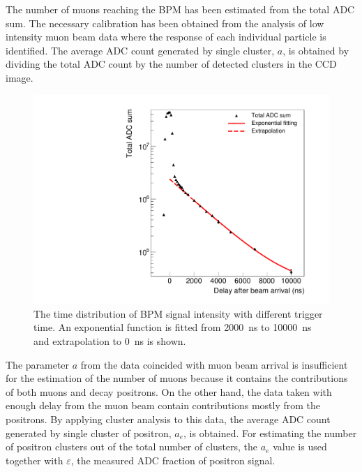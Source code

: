 \documentclass[preprint,3p,twocolumn]{elsarticle}
\begin{document}
The number of muons reaching the BPM has been estimated from the total ADC sum. The necessary calibration has been obtained from the analysis of low intensity muon beam data where the response of each individual particle is identified. The average ADC count generated by single cluster, $a$, is obtained by dividing the total ADC count by the number of detected clusters in the CCD image.
\begin{figure}[btp]
	\centering
	\includegraphics[width=\columnwidth]{figure/Decay_v3.pdf}
	\caption{The time distribution of BPM signal intensity with different trigger time. An exponential function is fitted from \SI{2000}{\ns} to \SI{10000}{\ns} and extrapolation to \SI{0}{\ns} is shown.}
	\label{fig:time_distribution}
\end{figure}

The parameter $a$ from the data coincided with muon beam arrival is insufficient for the estimation of the number of muons because it contains the contributions of both muons and decay positrons. On the other hand, the data taken with enough delay from the muon beam contain contributions mostly from the positrons. By applying cluster analysis to this data, the average ADC count generated by single cluster of positron, $a_e$, is obtained. For estimating the number of positron clusters out of the total number of clusters, the $a_e$ value is used together with $\varepsilon$, the measured ADC fraction of positron signal.
\end{document}
